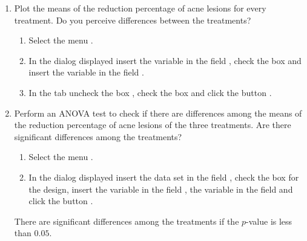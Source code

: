 \begin {enumerate}[leftmargin=*]
\begin{enumerate}
\item Plot the means of the reduction percentage of acne lesions for every treatment.
Do you perceive differences between the treatments?
\begin{indication}
\begin{enumerate}
\item Select the menu .
\item In the dialog displayed insert the variable  in the field , check the box
 and insert the variable  in the field .
\item In the  tab uncheck the box , check the box
 and click the button .
\end{enumerate}
\end{indication}

\item Perform an ANOVA test to check if there are differences among the means of the reduction percentage of acne
lesions of the three treatments.
Are there significant differences among the treatments?
\begin{indication}
\begin{enumerate}
\item Select the menu .
\item In the dialog displayed insert the data set  in the field , check the box
 for the design, insert the variable  in the field , the variable  in the field  and click
the button .
\end{enumerate}
There are significant differences among the treatments if the $p$-value is less than $0.05$.
\end{indication}


\end{enumerate}
\end{enumerate}
